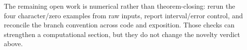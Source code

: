 \documentclass[11pt]{article}
\begin{document}
The remaining open work is numerical rather than theorem-closing: rerun the
four character/zero examples from raw inputs, report interval/error control,
and reconcile the branch convention across code and exposition.  Those checks
can strengthen a computational section, but they do not change the novelty
verdict above.



\end{document}
